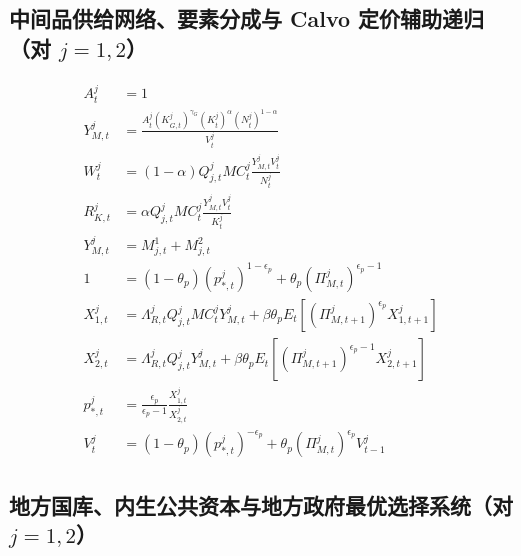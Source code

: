 \documentclass[12pt,UTF8]{ctexart}
\begin{document}
	\subsection{中间品供给网络、要素分成与 Calvo 定价辅助递归（对 \texorpdfstring{$j=1,2$}{j=1,2}）}
	\begin{align}
		A_t^j &=1 \label{a17}\\
		Y_{M,t}^j &=\frac{A_t^j(K_{G,t}^j)^{\gamma_G}(K_t^j)^{\alpha}(N_t^j)^{1-\alpha}}{V_t^j} \label{a18}\\
		W_t^j &=(1-\alpha)Q_{j,t}^jMC_t^j\frac{Y_{M,t}^jV_t^j}{N_t^j} \label{a19}\\
		R_{K,t}^j &=\alpha Q_{j,t}^jMC_t^j\frac{Y_{M,t}^jV_t^j}{K_t^j} \label{a20}\\
		Y_{M,t}^j &=M_{j,t}^1+M_{j,t}^2 \label{a21}\\
		1 &=(1-\theta_p)(p_{*,t}^j)^{1-\epsilon_p}+\theta_p(\Pi_{M,t}^j)^{\epsilon_p-1} \label{a22}\\
		X_{1,t}^j &=\Lambda_{R,t}^jQ_{j,t}^jMC_t^jY_{M,t}^j +\beta\theta_pE_t\left[(\Pi_{M,t+1}^j)^{\epsilon_p}X_{1,t+1}^j\right] \label{a23}\\
		X_{2,t}^j &=\Lambda_{R,t}^jQ_{j,t}^jY_{M,t}^j +\beta\theta_pE_t\left[(\Pi_{M,t+1}^j)^{\epsilon_p-1}X_{2,t+1}^j\right] \label{a24}\\
		p_{*,t}^j &=\frac{\epsilon_p}{\epsilon_p-1}\frac{X_{1,t}^j}{X_{2,t}^j} \label{a25}\\
		V_t^j &=(1-\theta_p)(p_{*,t}^j)^{-\epsilon_p}+\theta_p(\Pi_{M,t}^j)^{\epsilon_p}V_{t-1}^j \label{a26}
	\end{align}
	
	
	
\subsection{地方国库、内生公共资本与地方政府最优选择系统（对 \texorpdfstring{$j=1,2$}{j=1,2}）}
\end{document}
